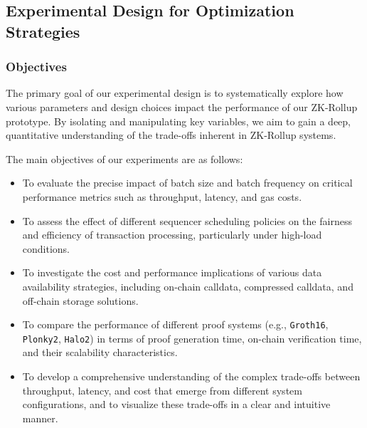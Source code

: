 
\subsection{Experimental Design for Optimization Strategies}
\subsubsection{Objectives}
The primary goal of our experimental design is to systematically explore how various parameters and design choices impact the performance of our ZK-Rollup prototype. By isolating and manipulating key variables, we aim to gain a deep, quantitative understanding of the trade-offs inherent in ZK-Rollup systems.

The main objectives of our experiments are as follows:
\begin{itemize}
\item To evaluate the precise impact of batch size and batch frequency on critical performance metrics such as throughput, latency, and gas costs.
\item To assess the effect of different sequencer scheduling policies on the fairness and efficiency of transaction processing, particularly under high-load conditions.
\item To investigate the cost and performance implications of various data availability strategies, including on-chain calldata, compressed calldata, and off-chain storage solutions.
\item To compare the performance of different proof systems (e.g., \texttt{Groth16}, \texttt{Plonky2}, \texttt{Halo2}) in terms of proof generation time, on-chain verification time, and their scalability characteristics.
\item To develop a comprehensive understanding of the complex trade-offs between throughput, latency, and cost that emerge from different system configurations, and to visualize these trade-offs in a clear and intuitive manner.
\end{itemize}

